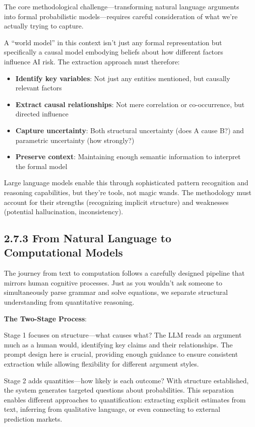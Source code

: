 \documentclass[
  11pt,
  letterpaper,
  openany]{book}
\providecommand{\tightlist}{%
  \setlength{\itemsep}{0pt}\setlength{\parskip}{0pt}}
\begin{document}
The core methodological challenge---transforming natural language
arguments into formal probabilistic models---requires careful
consideration of what we're actually trying to capture.

A ``world model'' in this context isn't just any formal representation
but specifically a causal model embodying beliefs about how different
factors influence AI risk. The extraction approach must therefore:

\begin{itemize}
\tightlist
\item
  \textbf{Identify key variables}: Not just any entities mentioned, but
  causally relevant factors
\item
  \textbf{Extract causal relationships}: Not mere correlation or
  co-occurrence, but directed influence
\item
  \textbf{Capture uncertainty}: Both structural uncertainty (does A
  cause B?) and parametric uncertainty (how strongly?)
\item
  \textbf{Preserve context}: Maintaining enough semantic information to
  interpret the formal model
\end{itemize}

Large language models enable this through sophisticated pattern
recognition and reasoning capabilities, but they're tools, not magic
wands. The methodology must account for their strengths (recognizing
implicit structure) and weaknesses (potential hallucination,
inconsistency).

\subsection{2.7.3 From Natural Language to Computational
Models}\label{sec-natural-to-computational}

The journey from text to computation follows a carefully designed
pipeline that mirrors human cognitive processes. Just as you wouldn't
ask someone to simultaneously parse grammar and solve equations, we
separate structural understanding from quantitative reasoning.

\textbf{The Two-Stage Process}:

Stage 1 focuses on structure---what causes what? The LLM reads an
argument much as a human would, identifying key claims and their
relationships. The prompt design here is crucial, providing enough
guidance to ensure consistent extraction while allowing flexibility for
different argument styles.

Stage 2 adds quantities---how likely is each outcome? With structure
established, the system generates targeted questions about
probabilities. This separation enables different approaches to
quantification: extracting explicit estimates from text, inferring from
qualitative language, or even connecting to external prediction markets.
\end{document}
